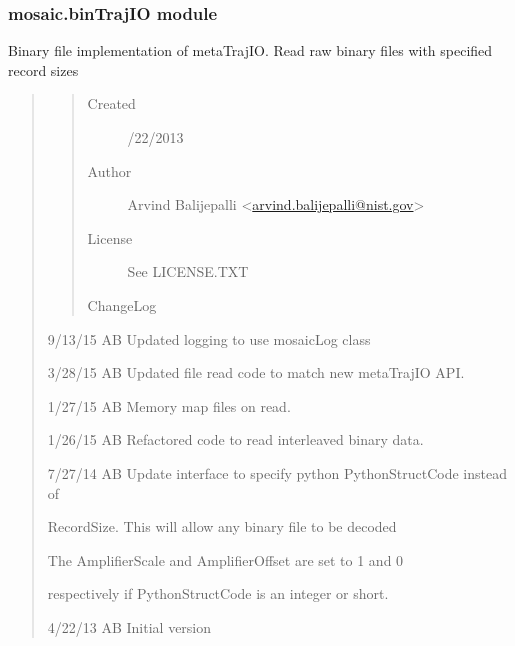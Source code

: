 \documentclass[letterpaper,10pt,english]{sphinxmanual}
\begin{document}
\subsubsection{mosaic.binTrajIO module}
\label{api-doc/mosaic.traj:mosaic-bintrajio-module}\label{api-doc/mosaic.traj:module-mosaic.binTrajIO}
Binary file implementation of metaTrajIO. Read raw binary files with specified record sizes
\begin{quote}
\begin{quote}\begin{description}
\item[{Created}] /22/2013

\item[{Author}] \leavevmode
Arvind Balijepalli \textless{}\href{mailto:arvind.balijepalli@nist.gov}{arvind.balijepalli@nist.gov}\textgreater{}

\item[{License}] \leavevmode
See LICENSE.TXT

\item[{ChangeLog}] \leavevmode
\end{description}\end{quote}

\begin{DUlineblock}{0em}
\item[] 9/13/15         AB      Updated logging to use mosaicLog class
\item[] 3/28/15         AB      Updated file read code to match new metaTrajIO API.
\item[] 1/27/15         AB      Memory map files on read.
\item[] 1/26/15         AB      Refactored code to read interleaved binary data.
\item[] 7/27/14         AB      Update interface to specify python PythonStructCode instead of
\item[]
\begin{DUlineblock}{\DUlineblockindent}
\item[] RecordSize. This will allow any binary file to be decoded
\item[] The AmplifierScale and AmplifierOffset are set to 1 and 0
\item[] respectively if PythonStructCode is an integer or short.
\end{DUlineblock}
\item[] 4/22/13         AB      Initial version
\end{DUlineblock}
\end{quote}
\end{document}
